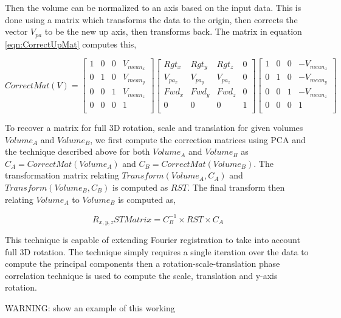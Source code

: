 Then the volume can be normalized to an axis based on the input data. This is done using a matrix which transforms the data to the origin, then corrects the vector $V_{pa}$ to be the new up axis, then transforms back. The matrix in equation \ref{eqn:CorrectUpMat} computes this,


\begin{equation} \label{eqn:CorrectUpMat}
CorrectMat(V) = \left[
\begin{array}{cccc}
1 & 0 & 0 & V_{mean_x} \\
0 & 1 & 0 & V_{mean_y} \\
0 & 0 & 1 & V_{mean_z} \\
0 & 0 & 0 & 1 \\
\end{array}
\right] \left[
\begin{array}{cccc}
Rgt_x & Rgt_y & Rgt_z & 0 \\
V_{pa_x} & V_{pa_y} & V_{pa_z} & 0 \\
Fwd_x & Fwd_y & Fwd_z & 0 \\
0 & 0 & 0 & 1 \\
\end{array}
\right] \left[
\begin{array}{cccc}
1 & 0 & 0 & -V_{mean_x} \\
0 & 1 & 0 & -V_{mean_y} \\
0 & 0 & 1 & -V_{mean_z} \\
0 & 0 & 0 & 1 \\
\end{array}
\right]
\end{equation}


To recover a matrix for full 3D rotation, scale and translation for given volumes $Volume_A$ and $Volume_B$, we first compute the correction matrices using PCA and the technique described above for both $Volume_A$ and $Volume_B$ as $C_A = CorrectMat(Volume_A)$ and $C_B = CorrectMat(Volume_B)$. The transformation matrix relating $Transform(Volume_A, C_A)$ and $Transform(Volume_B, C_B)$ is computed as $RST$. The final transform then relating $Volume_A$ to $Volume_B$ is computed as,

\begin{equation} \label{eqn:FullRSTTransform}
R_{x,y,z}ST Matrix = C_{B}^{-1} \times RST \times C_A
\end{equation}

This technique is capable of extending Fourier registration to take into account full 3D rotation. The technique simply requires a single iteration over the data to compute the principal components then a rotation-scale-translation phase correlation technique is used to compute the scale, translation and y-axis rotation. 

WARNING: show an example of this working



